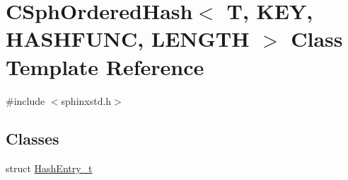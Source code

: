 \hypertarget{classCSphOrderedHash}{\section{C\-Sph\-Ordered\-Hash$<$ T, K\-E\-Y, H\-A\-S\-H\-F\-U\-N\-C, L\-E\-N\-G\-T\-H $>$ Class Template Reference}
\label{classCSphOrderedHash}
}


{\ttfamily \#include $<$sphinxstd.\-h$>$}

\subsection*{Classes}
\begin{DoxyCompactItemize}
\item 
struct \hyperlink{structCSphOrderedHash_1_1HashEntry__t}{Hash\-Entry\-\_\-t}
\end{DoxyCompactItemize}
